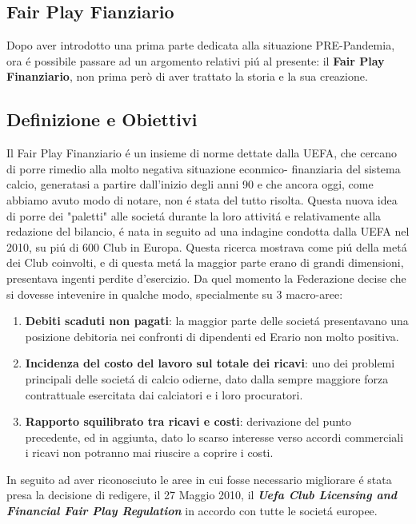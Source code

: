 \documentclass[
    corpo=12pt,
    oneside,
    evenboxes,
    tipotesi=triennale,
    stile=classica,
    oldstyle,
    autoretitolo,
    greek,
]{toptesi}
\begin{document}
\begin{interlinea}{1.5}
\chapter{Fair Play Fianziario}
Dopo aver introdotto una prima parte dedicata alla situazione PRE-Pandemia, ora \'e possibile passare ad un argomento relativi pi\'u al 
presente: il \textbf{Fair Play Finanziario}, non prima però di aver trattato la storia e la sua creazione.
\section{Definizione e Obiettivi}
Il Fair Play Finanziario \'e un insieme di norme dettate dalla UEFA, che cercano di porre rimedio alla molto negativa situazione econmico-
finanziaria del sistema calcio, generatasi a partire dall'inizio degli anni 90 e che ancora oggi, come abbiamo avuto modo di notare, non 
\'e stata del tutto risolta.
Questa nuova idea di porre dei "paletti" alle societ\'a durante la loro attivit\'a e relativamente alla redazione del bilancio, \'e
nata in seguito ad una indagine condotta dalla UEFA nel 2010, su pi\'u di 600 Club in Europa. Questa ricerca mostrava come pi\'u della met\'a
dei Club coinvolti, e di questa met\'a la maggior parte erano di grandi dimensioni, presentava ingenti perdite d'esercizio. Da quel momento
la Federazione decise che si dovesse intevenire in qualche modo, specialmente su 3 macro-aree:
\begin{enumerate}
    \item \textbf{Debiti scaduti non pagati}: la maggior parte delle societ\'a presentavano una posizione debitoria nei confronti
    di dipendenti ed Erario non molto positiva.
    \item \textbf{Incidenza del costo del lavoro sul totale dei ricavi}: uno dei problemi principali delle societ\'a di calcio odierne, dato
    dalla sempre maggiore forza contrattuale esercitata dai calciatori e i loro procuratori.
    \item \textbf{Rapporto squilibrato tra ricavi e costi}: derivazione del punto precedente, ed in aggiunta, dato lo scarso interesse verso
    accordi commerciali i ricavi non potranno mai riuscire a coprire i costi.
\end{enumerate}
In seguito ad aver riconosciuto le aree in cui fosse necessario migliorare \'e stata presa la decisione di redigere, il 27 Maggio 2010, il 
\textbf{\emph{Uefa Club Licensing and Financial Fair Play Regulation}} in accordo con tutte le societ\'a europee.
\end{interlinea}
\end{document}
